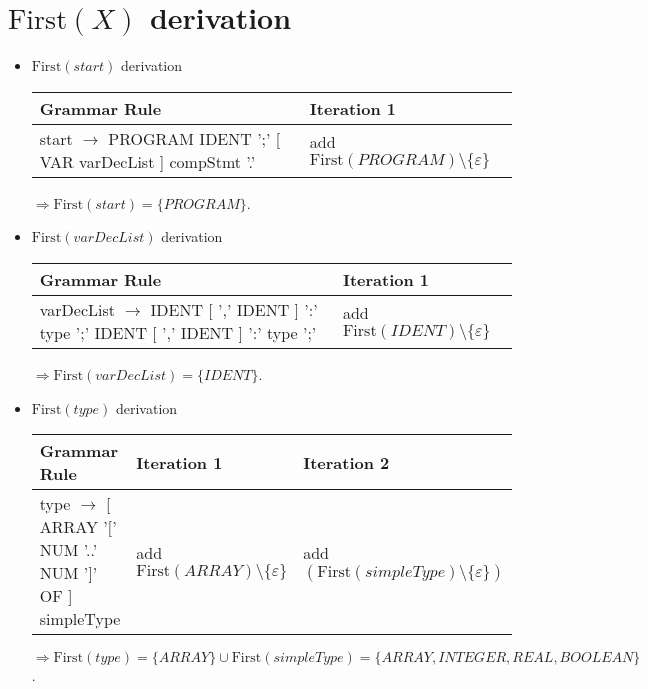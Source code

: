 \documentclass[8pt]{scrartcl}
\newcommand{\First}[1]{\mathrm{First}(#1)}
\newcommand{\epsset}{\{\varepsilon\}}
\begin{document}
        \section{$\First{X}$ derivation}
        \begin{itemize}
            \item $\First{start}$ derivation\newline
                \begin{tabular}{|l | l |}
                    \hline
                    \textbf{Grammar Rule} & \textbf{Iteration 1}\\
                    \hline
                    start $\rightarrow$ PROGRAM IDENT ';' [ VAR varDecList ] compStmt '.' & add $\First{PROGRAM} \setminus \epsset$\\
                    \hline
                \end{tabular}\newline
                $\Rightarrow \First{start} = \{PROGRAM\}$.
            \item $\First{varDecList}$ derivation\newline
                \begin{tabular}{|l |l |}
                    \hline
                    \textbf{Grammar Rule} & \textbf{Iteration 1}\\
                    \hline
                    varDecList $\rightarrow$ IDENT [ ',' IDENT ] ':' type ';' { IDENT [ ',' IDENT ] ':' type ';' } & add $\First{IDENT} \setminus \epsset$\\
                    \hline
                \end{tabular}\newline
                $\Rightarrow \First{varDecList} = \{IDENT\}$.
            \item $\First{type}$ derivation\newline
                \begin{tabular}{|l |l |l |}
                    \hline
                    \textbf{Grammar Rule} & \textbf{Iteration 1} & \textbf{Iteration 2}\\
                    \hline
                    type $\rightarrow$ [ ARRAY '$[$' NUM '..' NUM '$]$' OF ] simpleType & add $\First{ARRAY}\setminus \epsset$ & add $\left(\First{simpleType} \setminus \epsset\right)$ \\
                    \hline
                \end{tabular}\newline
                $\Rightarrow \First{type} = \{ARRAY\} \cup \First{simpleType} = \{ARRAY, INTEGER, REAL, BOOLEAN\}$.

\end{itemize}
\end{document}
